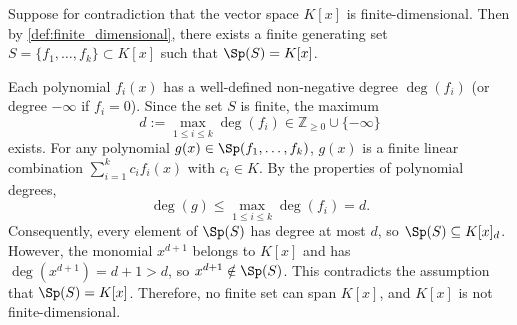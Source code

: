 \begin{exercisesolution}
\label{sol:polynomial_space_infinite_dim}
Suppose for contradiction that the vector space $K[x]$ is finite-di\-men\-sional. Then by \cref{def:finite_dimensional}, there exists a finite generating set $S = \{f_1, \dots, f_k\} \subset K[x]$ such that $\Sp(S) = K[x]$.

Each polynomial $f_i(x)$ has a well-defined non-negative degree $\deg(f_i)$ (or degree $-\infty$ if $f_i = 0$). Since the set $S$ is finite, the maximum
\[
d := \max_{1 \le i \le k} \deg(f_i) \in \mathbb{Z}_{\ge 0} \cup \{-\infty\}
\]
exists. For any polynomial $g(x) \in \Sp(f_1, \dots, f_k)$, $g(x)$ is a finite linear combination $\sum_{i=1}^k c_i f_i(x)$ with $c_i \in K$. By the properties of polynomial degrees,
\[
\deg(g) \le \max_{1 \le i \le k} \deg(f_i) = d.
\]
Consequently, every element of $\Sp(S)$ has degree at most $d$, so $\Sp(S) \subseteq K[x]_d$.
However, the monomial $x^{d+1}$ belongs to $K[x]$ and has $\deg(x^{d+1}) = d + 1 > d$, so $x^{d+1} \notin \Sp(S)$.
This contradicts the assumption that $\Sp(S) = K[x]$. Therefore, no finite set can span $K[x]$, and $K[x]$ is not finite-di\-men\-sional.
\end{exercisesolution}

